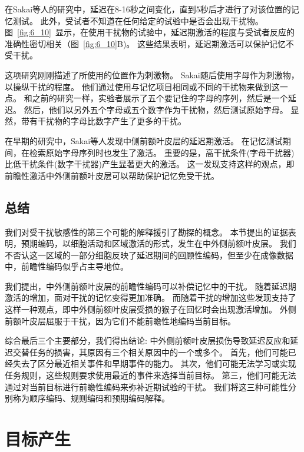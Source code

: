 在Sakai等人\cite{sakai2002active}的研究中，延迟在8-16秒之间变化，直到5秒后才进行了对该位置的记忆测试。
此外，受试者不知道在任何给定的试验中是否会出现干扰物。
图~\ref{fig:6_10}~显示，在使用干扰物的试验中，延迟期激活的程度与受试者反应的准确性密切相关（图~\ref{fig:6_10}B)。
这些结果表明，延迟期激活可以保护记忆不受干扰。


这项研究刚刚描述了所使用的位置作为刺激物。
Sakai\cite{sakai2004prefrontal}随后使用字母作为刺激物，以操纵干扰的程度。
他们通过使用与记忆项目相同或不同的干扰物来做到这一点。
和之前的研究一样，实验者展示了五个要记住的字母的序列，然后是一个延迟。
然后，他们以另外五个字母或五个数字作为干扰物，然后测试原始字母。
显然，带有干扰物的字母比数字产生了更多的干扰。


在早期的研究中，Sakai等人\cite{sakai2002parahippocampal}发现中侧前额叶皮层的延迟期激活。
在记忆测试期间，在检索原始字母序列时也发生了激活。
重要的是，高干扰条件(字母干扰器)比低干扰条件(数字干扰器)产生显著更大的激活。
这一发现支持这样的观点，即前瞻性激活中外侧前额叶皮层可以帮助保护记忆免受干扰。



\subsection{总结}

我们对受干扰敏感性的第三个可能的解释援引了勘探的概念。
本节提出的证据表明，预期编码，以细胞活动和区域激活的形式，发生在中外侧前额叶皮层。
我们不否认这一区域的一部分细胞反映了延迟期间的回顾性编码，但至少在成像数据中，前瞻性编码似乎占主导地位。


我们提出，中外侧前额叶皮层的前瞻性编码可以补偿记忆中的干扰。
随着延迟期激活的增加，面对干扰的记忆变得更加准确。
而随着干扰的增加这些发现支持了这样一种观点，即中外侧前额叶皮层受损的猴子在回忆时会出现激活增加。
外侧前额叶皮层屈服于干扰，因为它们不能前瞻性地编码当前目标。


综合最后三个主要部分，我们得出结论: 中外侧前额叶皮层损伤导致延迟反应和延迟交替任务的损害，其原因有三个相关原因中的一个或多个。
首先，他们可能已经失去了区分最近相关事件和早期事件的能力。
其次，他们可能无法学习或实现任务规则，这些规则要求使用最近的事件来选择当前目标。
第三，他们可能无法通过对当前目标进行前瞻性编码来弥补近期试验的干扰。
我们将这三种可能性分别称为顺序编码、规则编码和预期编码解释。



\section{目标产生}


